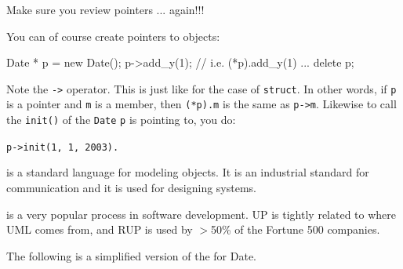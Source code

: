 \newpage{}



\newpage{}

Make sure you review pointers ... again!!!

You can of course create pointers to objects:

\begin{consolethree}[escapeinside=||]
Date * p = new Date();
p->add_y(1); // i.e. (*p).add_y(1)
...
delete p;
\end{consolethree}

Note the \verb!->! operator. This is just like for the case
of \texttt{struct}. In other words, if \texttt{p} is a pointer and \texttt{m}
is a member, then \texttt{(*p).m} is the same as \verb!p->m!.
Likewise to call the \texttt{init()} of the \texttt{Date} \texttt{p} is
pointing to, you do:

\verb!p->init(1, 1, 2003).!













\newpage{}

 is a standard language for
modeling objects. It is an industrial standard for communication and it
is used for designing systems.

 is a very popular process in software
development. UP is tightly related to  where UML comes from, and RUP is used by $>$50\% of
the Fortune 500 companies.

The following is a simplified version of the  for Date.

